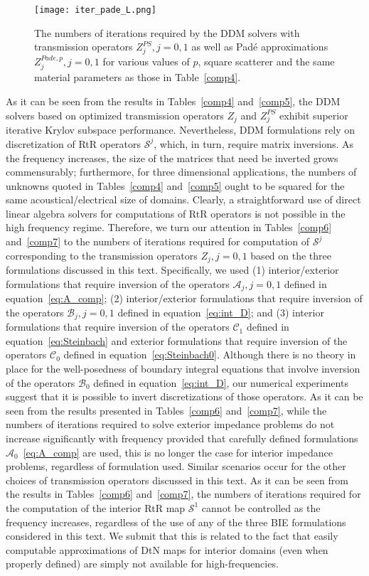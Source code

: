 \documentclass[11pt]{article}
\numberwithin{equation}{section}
\begin{document}
\begin{figure}
\centering
\texttt{[image: iter\_pade\_L.png]}
\caption{The numbers of iterations required by the DDM solvers with transmission operators $Z_j^{PS},j=0,1$ as well as Pad\'e approximations $Z_j^{Pade,p}, j=0,1$ for various values of $p$, square scatterer and the same material parameters as those in Table~\ref{comp4}.}
\label{fig:pade}
\end{figure}

As it can be seen from the results in Tables~\ref{comp4} and~\ref{comp5}, the DDM solvers based on optimized transmission operators $Z_j$ and $Z_j^{PS}$ exhibit superior iterative Krylov subspace performance. Nevertheless, DDM formulations rely on discretization of RtR operators $\mathcal{S}^j$, which, in turn, require matrix inversions. As the frequency increases, the size of the matrices that need be inverted grows commensurably; furthermore, for three dimensional applications, the numbers of unknowns quoted in Tables~\ref{comp4} and~\ref{comp5} ought to be squared for the same acoustical/electrical size of domains. Clearly, a straightforward use of direct linear algebra solvers for computations of RtR operators is not possible in the high frequency regime. Therefore, we turn our attention in Tables~\ref{comp6} and~\ref{comp7} to the numbers of iterations required for computation of $\mathcal{S}^j$ corresponding to the transmission operators $Z_j,j=0,1$ based on the three formulations discussed in this text. Specifically, we used (1) interior/exterior formulations that require inversion of the operators $\mathcal{A}_j,j=0,1$ defined in equation~\eqref{eq:A_comp}; (2) interior/exterior formulations that require inversion of the operators $\mathcal{B}_j,j=0,1$ defined in equation~\eqref{eq:int_D}; and (3) interior formulations that require inversion of the operators $\mathcal{C}_1$ defined in equation~\eqref{eq:Steinbach} and exterior formulations that require inversion of the operators $\mathcal{C}_0$ defined in equation~\eqref{eq:Steinbach0}. Although there is no theory in place for the well-posedness of boundary integral equations that involve inversion of the operators $\mathcal{B}_0$ defined in equation~\eqref{eq:int_D}, our numerical experiments suggest that it is possible to invert discretizations of those operators. As it can be seen from the results presented in Tables~\ref{comp6} and~\ref{comp7}, while the numbers of iterations required to solve exterior impedance problems do not increase significantly with frequency provided that carefully defined formulations $\mathcal{A}_0$~\eqref{eq:A_comp} are used, this is no longer the case for interior impedance problems, regardless of formulation used. Similar scenarios occur for the other choices of transmission operators discussed in this text. As it can be seen from the results in  Tables~\ref{comp6} and~\ref{comp7}, the numbers of iterations required for the computation of the interior RtR map $\mathcal{S}^1$ cannot be controlled as the frequency increases, regardless of the use of any of the three BIE formulations considered in this text. We submit that this is related to the fact that easily computable approximations of DtN maps for interior domains (even when properly defined) are simply not available for high-frequencies.   
\end{document}
